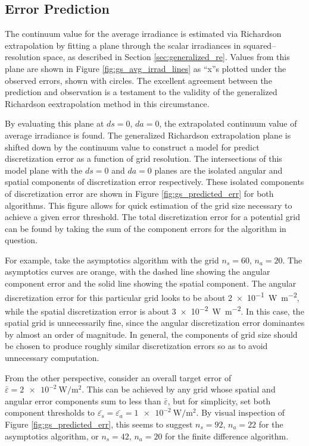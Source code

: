 \subsection{Error Prediction}
The continuum value for the average irradiance is estimated via Richardson extrapolation by fitting a plane through the scalar irradiances in squared--resolution space, as described in Section \ref{sec:generalized_re}.
Values from this plane are shown in Figure \ref{fig:gs_avg_irrad_lines} as ``x''s plotted under the observed errors, shown with circles.
The excellent agreement between the prediction and observation is a testament to the validity of the generalized Richardson eextrapolation method in this circumstance.

By evaluating this plane at $ds=0$, $da=0$, the extrapolated continuum value of average irradiance is found.
The generalized Richardson extrapolation plane is shifted down by the continuum value to construct a model for predict discretization error as a function of grid resolution.
The intersections of this model plane with the $ds=0$ and $da=0$ planes are the isolated angular and spatial components of discretization error respectively.
These isolated components of discretization error are shown in Figure \ref{fig:gs_predicted_err} for both algorithms.
This figure allows for quick estimation of the grid size necessary to achieve a given error threshold.
The total discretization error for a potential grid can be found by taking the sum of the component errors for the algorithm in question.

For example, take the asymptotics algorithm with the grid $n_s=60$, $n_a=20$.
The asymptotics curves are orange, with the dashed line showing the angular component error and the solid line showing the spatial component.
The angular discretization error for this particular grid looks to be about \SI{2e-1}{\W\per\m\squared}, while the spatial discretization error is about \SI{3e-2}{\W\per\m\squared}.
In this case, the spatial grid is unnecessarily fine, since the angular discretization error dominantes by almost an order of magnitude.
In general, the components of grid size should be chosen to produce roughly similar discretization errors so as to avoid unnecessary computation.

From the other perspective, consider an overall target error of $\bar{\varepsilon}=\SI{2e-2}{\W\per\m\squared}$.
This can be achieved by any grid whose spatial and angular error components sum to less than $\bar{\varepsilon}$, but for simplicity, set both component thresholds to $\bar{\varepsilon_s}=\bar{\varepsilon_a}=\SI{1e-2}{\W\per\m\squared}$.
By visual inspection of Figure \ref{fig:gs_predicted_err}, this seems to suggest $n_s=92$, $n_a=22$ for the asymptotics algorithm, or $n_s=42$, $n_a=20$ for the finite difference algorithm.

